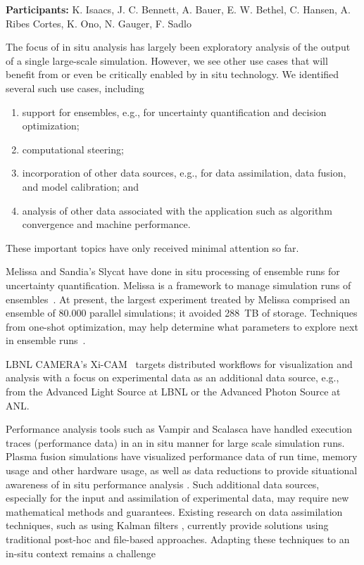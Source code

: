 \license

\textbf{\sffamily Participants:} K. Isaacs, J. C. Bennett, A. Bauer, E. W. Bethel, C. Hansen, A. Ribes Cortes, K. Ono, N. Gauger, F. Sadlo

\begin{refsection}

The focus of in situ analysis has largely been exploratory analysis of the output of a single large-scale simulation. 
However, we see other use cases that will benefit from or even be critically enabled by in situ technology. 
We identified several such use cases, including 
\begin{enumerate}
    \item support for ensembles, e.g., for uncertainty quantification and decision optimization;
    \item computational steering;
    \item  incorporation of other data sources, e.g., for data assimilation, data fusion, and model calibration; and
    \item analysis of other data associated with the application such as algorithm convergence and machine performance. 
\end{enumerate}
These important topics have only received minimal attention so far. 

Melissa and Sandia’s Slycat have done in situ processing of ensemble runs for uncertainty quantification.
Melissa is a framework to manage simulation runs of ensembles~\cite{Terraz17}. 
At present, the largest experiment treated by Melissa comprised an ensemble of 80.000 parallel simulations; it avoided 288~TB of storage.
Techniques from one-shot optimization, may help determine what parameters to explore next in ensemble runs~\cite{Gunther15}.

LBNL CAMERA's Xi-CAM~\cite{XiCAM} targets distributed workflows for visualization and analysis with a focus on experimental data as an additional data source, e.g., from the Advanced Light Source at LBNL or the Advanced Photon Source at ANL. 

Performance analysis tools such as Vampir and Scalasca have handled execution traces (performance data) in an in situ manner for large scale simulation runs. Plasma fusion simulations have visualized performance data of run time, memory usage and other hardware usage, as well as data reductions to provide situational awareness of in situ performance analysis \cite{WOIV_2018}.
Such additional data sources, especially for the input and assimilation of experimental data, may require new mathematical methods and guarantees.
Existing research on data assimilation techniques, such as using Kalman filters \cite{Eversen09}, currently provide solutions using traditional post-hoc and file-based approaches. Adapting these techniques to an in-situ context remains a challenge


\end{refsection}
